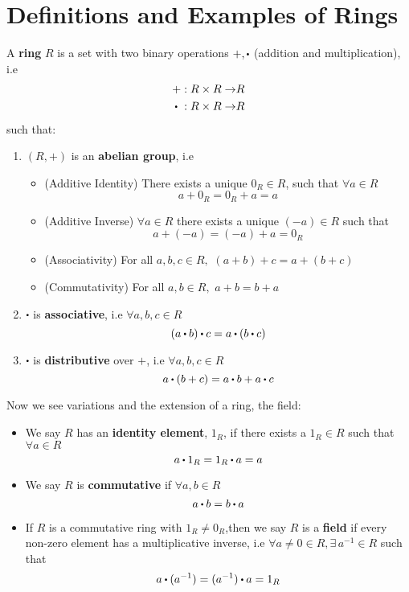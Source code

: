 \documentclass[../Main.tex]{subfiles}
\begin{document}
\chapter{Definitions and Examples of Rings}
\begin{dfn}[title= Rings and Fields]
	A \textbf{ring} $R$ is a set with two binary operations $+,\rdot$ (addition and multiplication), i.e 
	\begin{align*}
		+: R \times R \to &R \\
		\rdot \hspace{3pt}: R \times R \to &R 
	\end{align*}
such that:
\begin{enumerate}
	\item $(R,+)$ is an \textbf{abelian group}, i.e
	\begin{itemize}
		\item (Additive Identity) There exists a unique $0_R \in R$, such that $\forall a \in R$ \[a+0_R=0_R+a=a\]
		\item (Additive Inverse) $\forall a\in R$ there exists a unique $(-a) \in R$ such that
		\[a+(-a)=(-a)+a=0_R\]
		\item (Associativity) For all $a,b,c \in R, \,\, (a+b)+c=a+(b+c)$
		\item
		(Commutativity) For all $a,b\in R,\,\, a+b=b+a$
	\end{itemize} 
	\item $\rdot$ is \textbf{associative}, i.e  $\forall a,b,c\in R$
	\[(a\rdot b)\rdot c = a\rdot (b\rdot c)\]
	\item $\rdot$ is \textbf{distributive} over $+$, i.e $\forall a,b,c\in R$
	\[a\rdot(b+c)=a\rdot b+a\rdot c\]
\end{enumerate}
Now we see variations and the extension of a ring, the field:
\begin{itemize}
	\item We say $R$ has an \textbf{identity element}, $1_R$, if there exists a $1_R \in R$ such that $\forall a \in R$
	\[a\rdot 1_R =1_R \rdot a = a\]
	\item We say $R$ is \textbf{commutative} if $\forall a,b \in R$
	\[a\rdot b=b\rdot a\]	
	\item If $R$ is a commutative ring with $1_R \ne 0_R$,then we say $R$ is a \textbf{field} if every non-zero element has a multiplicative inverse, i.e $\forall a\ne0 \in R, \exists\, a^{-1}\in R$ such that
	\[ a\rdot(a^{-1})=(a^{-1})\rdot a = 1_R \]
\end{itemize}
\end{dfn}
\end{document}
